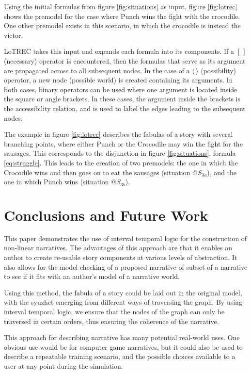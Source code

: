 \documentclass{llncs}
\begin{document}
Using the initial formulas from figure \ref{fig:situations} as input, figure \ref{fig:lotrec} shows the premodel for the case where Punch wins the fight with the crocodile. One other premodel exists in this scenario, in which the crocodile is instead the victor.

LoTREC takes this input and expands each formula into its components. If a $[\,]$ (necessary) operator is encountered, then the formulas that serve as its argument are propagated across to all subsequent nodes. In the case of a $\langle \, \rangle$ (possibility) operator, a new node (possible world) is created containing its arguments. In both cases, binary operators can be used where one argument is located inside the square or angle brackets. In these cases, the argument inside the brackets is the accessibility relation, and is used to label the edges leading to the subsequent nodes.

The example in figure \ref{fig:lotrec} describes the fabulas of a story with several branching points, where either Punch or the Crocodile may win the fight for the sausages. This corresponds to the disjunction in figure \ref{fig:situations}, formula \ref{eq:struggle}. This leads to the creation of two premodels: the one in which the Crocodile wins and then goes on to eat the sausages (situation $@S_{3a}$), and the one in which Punch wins (situation $@S_{3b}$).

\section{Conclusions and Future Work}
This paper demonstrates the use of interval temporal logic for the construction of non-linear narratives. The advantages of this approach are that it enables an author to create re-usable story components at various levels of abstraction. It also allows for the model-checking of a proposed narrative of subset of a narrative to see if it fits with an author's model of a narrative world.

Using this method, the fabula of a story could be laid out in the original model, with the syuzhet emerging from different ways of traversing the graph. By using interval temporal logic, we ensure that the nodes of the graph can only be traversed in certain orders, thus ensuring the coherence of the narrative.

This approach for describing narrative has many potential real-world uses. One obvious use would be for computer game narratives, but it could also be used to describe a repeatable training scenario, and the possible choices available to a user at any point during the simulation.
\end{document}
